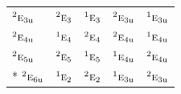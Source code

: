 \documentclass[10pt,a4paper]{article}
\numberwithin{equation}{section}
\newcommand{\irr}[1]{\text{\normalfont\scshape #1}}
\newcommand{\conjpair}[1]{{}^{#1}}
\newcommand{\ptag}[1]{\mathrm{#1}}
\begin{document}
{\begin{longtable}{@{}lcccc@{}}
$\conjpair{2}\irr{e}_{3\ptag{u}}$ & $\conjpair{2}\irr{e}_{3}$ & $\conjpair{1}\irr{e}_{3}$ & $\conjpair{2}\irr{e}_{3\ptag{u}}$ & $\conjpair{1}\irr{e}_{3\ptag{u}}$\\
$\conjpair{2}\irr{e}_{4\ptag{u}}$ & $\conjpair{1}\irr{e}_{4}$ & $\conjpair{2}\irr{e}_{4}$ & $\conjpair{2}\irr{e}_{4\ptag{u}}$ & $\conjpair{1}\irr{e}_{4\ptag{u}}$\\
$\conjpair{2}\irr{e}_{5\ptag{u}}$ & $\conjpair{2}\irr{e}_{5}$ & $\conjpair{1}\irr{e}_{5}$ & $\conjpair{1}\irr{e}_{4\ptag{u}}$ & $\conjpair{2}\irr{e}_{4\ptag{u}}$\\*
$\conjpair{2}\irr{e}_{6\ptag{u}}$ & $\conjpair{1}\irr{e}_{2}$ & $\conjpair{2}\irr{e}_{2}$ & $\conjpair{1}\irr{e}_{3\ptag{u}}$ & $\conjpair{2}\irr{e}_{3\ptag{u}}$\\
\bottomrule\end{longtable}}
\end{document}
